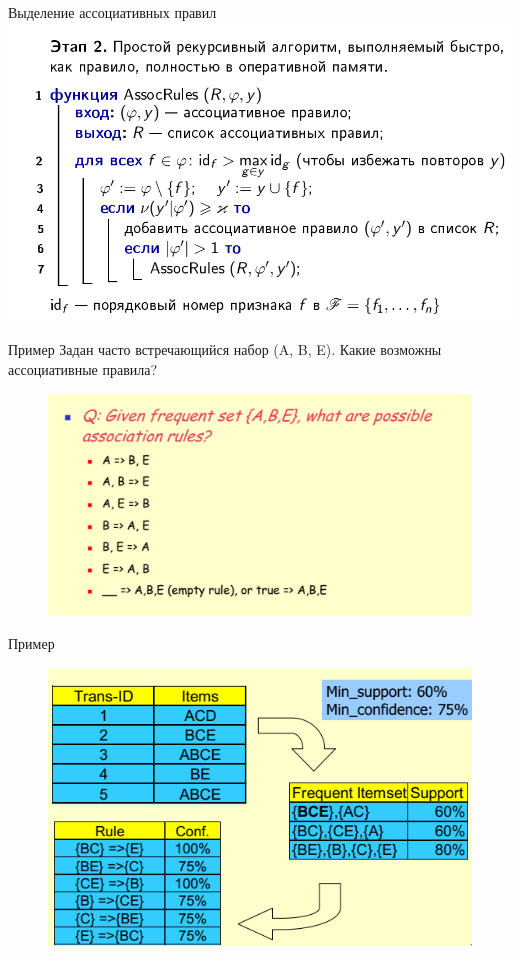 \documentclass{beamer}
\begin{document}
\begin{frame}{Выделение ассоциативных правил}
		\includegraphics[scale=0.5]{images/lec08-pic14.png}
\end{frame}

\begin{frame}{Пример}
	Задан часто встречающийся набор (A, B, E). Какие возможны ассоциативные правила?
	\begin{figure}[h]
		\centering
		\includegraphics[scale=0.75]{images/lec08-pic15.png}
	\end{figure}
\end{frame}

\begin{frame}{Пример}
	\begin{figure}[h]
		\centering
		\includegraphics[scale=0.75]{images/lec08-pic16.png}
	\end{figure}
\end{frame}
\end{document}

